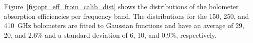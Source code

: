 \documentclass[../EBEXPaper2.tex]{subfiles}
\begin{document}

Figure~\ref{fig:opt_eff_from_calib_dist} shows the distributions of the bolometer absorption efficiencies per frequency band.
The distributions for the 150, 250, and 410~GHz bolometers are fitted to Gaussian functions and have an average of 29, 20, and 2.6\% and a standard deviation of 6, 10, and 0.9\%, respectively. %
\end{document}
